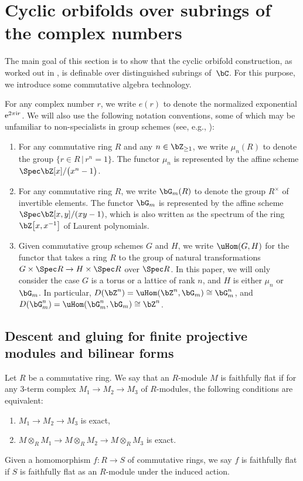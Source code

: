 \section{Cyclic orbifolds over subrings of the complex numbers}

The main goal of this section is to show that the cyclic orbifold construction, as worked out in \cite{vEMS}, is definable over distinguished subrings of~$\bC$. For this purpose, we introduce some commutative algebra technology.

For any complex number $r$, we write $e(r)$ to denote the normalized exponential ${\rm e}^{2\pi {\rm i} r}$. We will also use the following notation conventions, some of which may be unfamiliar to non-specialists in group schemes (see, e.g., \cite{SGA3}):
\begin{enumerate}\itemsep=0pt
\item For any commutative ring $R$ and any $n \in \bZ_{\geq 1}$, we write $\mu_n(R)$ to denote the group $\{ r \in R \,|\, r^n = 1\}$. The functor $\mu_n$ is represented by the affine scheme $\Spec \bZ[x]/\big(x^n-1\big)$.
\item For any commutative ring $R$, we write $\bG_m(R)$ to denote the group $R^\times$ of invertible elements. The functor $\bG_m$ is represented by the affine scheme $\Spec \bZ[x,y]/(xy-1)$, which is also written as the spectrum of the ring $\bZ\big[x,x^{-1}\big]$ of Laurent polynomials.
\item Given commutative group schemes $G$ and $H$, we write $\uHom(G,H)$ for the functor that takes a ring $R$ to the group of natural transformations $G \times \Spec R \to H \times \Spec R$ over $\Spec R$. In this paper, we will only consider the case $G$ is a torus or a lattice of rank $n$, and $H$ is either $\mu_n$ or~$\bG_m$. In particular, $D(\bZ^n) = \uHom(\bZ^n,\bG_m) \cong \bG_m^n$, and $D(\bG_m^n) = \uHom(\bG_m^n, \bG_m) \cong \bZ^n$.
\end{enumerate}

\subsection{Descent and gluing for finite projective modules and bilinear forms}

\begin{defn}
Let $R$ be a commutative ring. We say that an $R$-module $M$ is faithfully flat if for any 3-term complex $M_1 \to M_2 \to M_3$ of $R$-modules, the following conditions are equivalent:
\begin{enumerate}\itemsep=0pt
\item[1)] $M_1 \to M_2 \to M_3$ is exact,
\item[2)] $M \otimes_{R} M_1 \to M \otimes_{R} M_2 \to M \otimes_{R} M_3$ is exact.
\end{enumerate}
Given a homomorphism $f\colon R \to S$ of commutative rings, we say $f$ is faithfully flat if $S$ is faithfully flat as an $R$-module under the induced action.
\end{defn}

